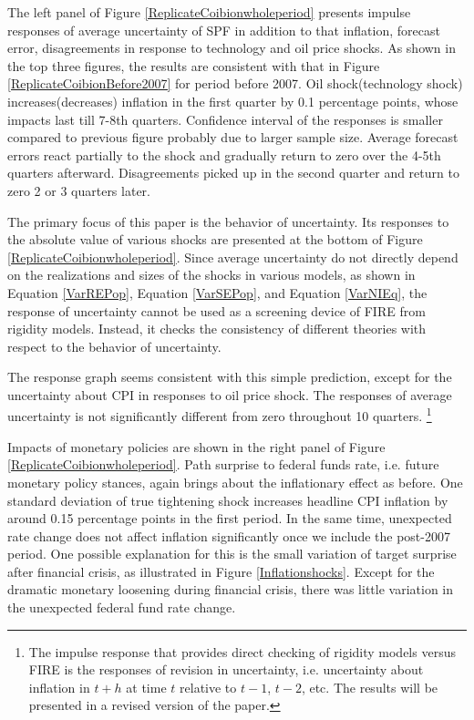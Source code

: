 \documentclass[]{article}
\begin{document}
	The left panel of  Figure \ref{ReplicateCoibionwholeperiod} presents impulse responses of average uncertainty of SPF in addition to that inflation, forecast error, disagreements in response to technology and oil price shocks. As shown in the top three figures, the results are consistent with that in Figure \ref{ReplicateCoibionBefore2007} for period before 2007.  Oil shock(technology shock) increases(decreases) inflation in the first quarter by 0.1 percentage  points, whose impacts last till 7-8th quarters. Confidence interval of the responses is smaller compared to previous figure probably due to larger sample size.  Average forecast errors react partially to the shock and gradually return to zero over the 4-5th quarters afterward. Disagreements picked up in the second quarter and return to zero 2 or 3 quarters  later. 
	
	
	The primary focus of this paper is the behavior of uncertainty. Its responses to the absolute value of various shocks are presented at the bottom of Figure \ref{ReplicateCoibionwholeperiod}. Since average uncertainty do not directly depend on the realizations and sizes of the shocks in various models, as shown in Equation \ref{VarREPop},  Equation \ref{VarSEPop}, and Equation \ref{VarNIEq}, the response of uncertainty cannot be used as a screening device of  FIRE from rigidity models. Instead, it checks the consistency of different theories with respect to the behavior of uncertainty.  
	
	The response graph seems consistent with this simple prediction, except for the uncertainty about CPI in responses to oil price shock. The responses of average uncertainty is not significantly different from zero throughout 10 quarters. \footnote{The impulse response that provides direct checking of rigidity models versus FIRE is the responses of revision in uncertainty, i.e. uncertainty about inflation in $t+h$ at time $t$ relative to $t-1$, $t-2$, etc. The results will be presented in a revised version of the paper.} 
	
	Impacts of monetary policies are shown in the right panel of Figure \ref{ReplicateCoibionwholeperiod}. Path surprise to federal funds rate, i.e. future monetary policy stances, again brings about the inflationary effect as before. One standard deviation of true tightening shock increases headline CPI inflation by around 0.15 percentage points in the first period.  In the same time, unexpected rate change does not affect inflation significantly once we include the post-2007 period.  One possible explanation for this is the small variation of target surprise after financial crisis, as illustrated in Figure \ref{Inflationshocks}. Except for the dramatic monetary loosening during financial crisis, there was little variation in the unexpected federal fund rate change.  
	
\end{document}
